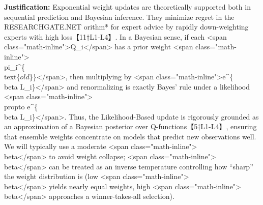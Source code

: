 \documentclass{article}
\begin{document}
\textbf{Justification:} Exponential weight updates are theoretically supported both in sequential prediction and Bayesian inference. They minimize regret in the ​
RESEARCHGATE.NET
orithm* for expert advice by rapidly down-weighting experts with high loss【11†L1-L4】. In a Bayesian sense, if each <span class="math-inline">Q\_i</span> has a prior weight <span class="math-inline">\\pi\_i^\{\\text\{\(old\)\}\}</span>, then multiplying by <span class="math-inline">e^\{\-\\beta L\_i\}</span> and renormalizing is exactly Bayes’ rule under a likelihood <span class="math-inline">\\propto e^\{\-\\beta L\_i\}</span>. Thus, the Likelihood-Based update is rigorously grounded as an approximation of a Bayesian posterior over Q-functions【5†L1-L4】, ensuring that ensemble weights concentrate on models that predict new observations well. We will typically use a moderate <span class="math-inline">\\beta</span> to avoid weight collapse; <span class="math-inline">\\beta</span> can be treated as an inverse temperature controlling how “sharp” the weight distribution is (low <span class="math-inline">\\beta</span> yields nearly equal weights, high <span class="math-inline">\\beta</span> approaches a winner-takes-all selection).
\end{document}
